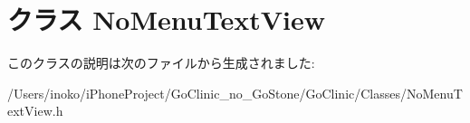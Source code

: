 \hypertarget{interface_no_menu_text_view}{
\section{クラス NoMenuTextView}
\label{interface_no_menu_text_view}
}


このクラスの説明は次のファイルから生成されました:\begin{DoxyCompactItemize}
\item 
/Users/inoko/iPhoneProject/GoClinic\_\-no\_\-GoStone/GoClinic/Classes/NoMenuTextView.h\end{DoxyCompactItemize}
